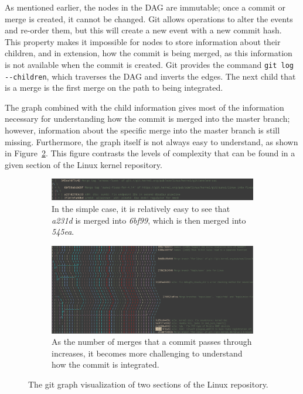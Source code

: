 As mentioned earlier, the nodes in the DAG are immutable;
once a commit or merge is created, it cannot be changed.
Git allows operations to alter the events and re-order them,
but this will create a new event with a new commit hash.
This property makes it impossible for nodes to store information about
their children, and in extension, how the commit is being merged, as
this information is not available when the commit is created.
Git provides the command \verb|git log --children|, which traverses the
DAG and inverts the edges.
The next child that is a merge is the first merge on the path to being
integrated.

The graph combined with the child information gives most of the
information necessary for understanding how the commit is
merged into the master branch; however, information about the specific
merge into the master branch is still missing.
Furthermore, the graph itself is not always easy to understand, as shown
in Figure~\ref{fig:git_graphs}.
This figure contrasts the levels of complexity that can be found in a
given section of the Linux kernel repository.

\begin{figure}[htpb]
  \centering
  \begin{subfigure}[b]{0.8\textwidth}
    \includegraphics[width=\textwidth]{Figures/background/git_graph.png}
    \caption{In the simple case, it is relatively easy to see
      that \textit{a231d} is merged into \textit{6bf99},
      which is then merged into \textit{545ea}.}
    \label{fig:trivial_graph}
  \end{subfigure}

  \begin{subfigure}[b]{0.8\textwidth}
    \includegraphics[width=\textwidth]{Figures/background/git_graph_complex.png}
    \caption{As the number of merges that a commit passes through
      increases, it becomes more challenging to understand how the
      commit is integrated.}
  \end{subfigure}
  \caption{The git graph visualization of two sections of the Linux
    repository.}
  \label{fig:git_graphs}
\end{figure}

